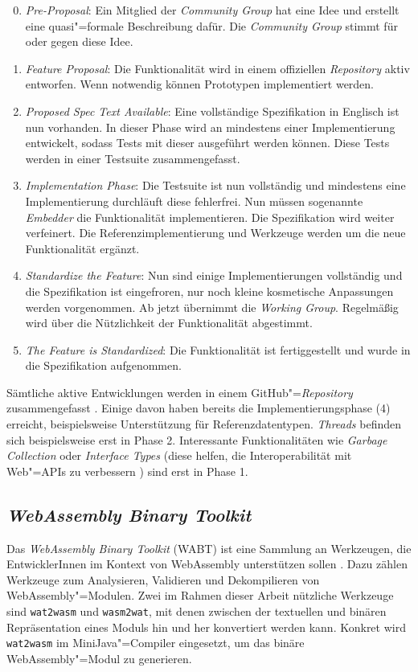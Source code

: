 \begin{enumerate}
    \setcounter{enumi}{-1}
    \item \emph{Pre-Proposal}: Ein Mitglied der \emph{Community Group} hat eine Idee und erstellt eine quasi"=formale Beschreibung dafür. Die \emph{Community Group} stimmt für oder gegen diese Idee.
    \item \emph{Feature Proposal}: Die Funktionalität wird in einem offiziellen \emph{Repository} aktiv entworfen. Wenn notwendig können Prototypen implementiert werden.
    \item \emph{Proposed Spec Text Available}: Eine vollständige Spezifikation in Englisch ist nun vorhanden. In dieser Phase wird an mindestens einer Implementierung entwickelt, sodass Tests mit dieser ausgeführt werden können. Diese Tests werden in einer Testsuite zusammengefasst.
    \item \emph{Implementation Phase}: Die Testsuite ist nun vollständig und mindestens eine Implementierung durchläuft diese fehlerfrei. Nun müssen sogenannte \emph{Embedder} die Funktionalität implementieren. Die Spezifikation wird weiter verfeinert. Die Referenzimplementierung und Werkzeuge werden um die neue Funktionalität ergänzt.
    \item \emph{Standardize the Feature}: Nun sind einige Implementierungen vollständig und die Spezifikation ist eingefroren, nur noch kleine kosmetische Anpassungen werden vorgenommen. Ab jetzt übernimmt die \emph{Working Group}. Regelmäßig wird über die Nützlichkeit der Funktionalität abgestimmt.
    \item \emph{The Feature is Standardized}: Die Funktionalität ist fertiggestellt und wurde in die Spezifikation aufgenommen.
\end{enumerate}

Sämtliche aktive Entwicklungen werden in einem GitHub"=\emph{Repository} zusammengefasst \cite{WebAssemblyProposals}.
Einige davon haben bereits die Implementierungsphase (4) erreicht, beispielsweise Unterstützung für Referenzdatentypen. \emph{Threads} befinden sich beispielsweise erst in Phase 2. Interessante Funktionalitäten wie \emph{Garbage Collection} oder \emph{Interface Types} (diese helfen, die Interoperabilität mit Web"=APIs zu verbessern \cite{WebAssemblyInterfaceTypes}) sind erst in Phase 1.

\subsection{\emph{WebAssembly Binary Toolkit}}
Das \emph{WebAssembly Binary Toolkit} (WABT) ist eine Sammlung an Werkzeugen, die EntwicklerInnen im Kontext von WebAssembly unterstützen sollen \cite{WABT}. Dazu zählen Werkzeuge zum Analysieren, Validieren und Dekompilieren von WebAssembly"=Modulen. Zwei im Rahmen dieser Arbeit nützliche Werkzeuge sind \lstinline{wat2wasm} und \lstinline{wasm2wat}, mit denen zwischen der textuellen und binären Repräsentation eines Moduls hin und her konvertiert werden kann. Konkret wird \lstinline{wat2wasm} im MiniJava"=Compiler eingesetzt, um das binäre WebAssembly"=Modul zu generieren.

